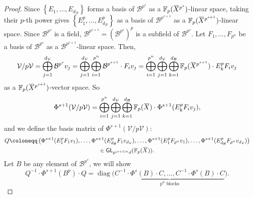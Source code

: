 \documentclass[letterpaper, 11pt, thm-restate]{article}
\numberwithin{equation}{section}
\newcommand{\F}{\mathbb{F}}
\newcommand{\GL}{\mathsf{GL}}
\newcommand{\diag}{\operatorname{diag}}
\newcommand{\mV}{\mathcal{V}}
\newcommand{\mB}{\mathcal{B}}
\newcommand{\oX}{\mkern 1.5mu\overline{\mkern-1.5mu X \mkern-1.5mu}\mkern 1.5mu}
\theoremstyle{definition}
\theoremstyle{definition}
\theoremstyle{definition}
\begin{document}
\begin{proof}
    Since $\left\{E_1, \ldots, E_{d_{\mB}}\right\}$ forms a basis of $\mB^{p^{s}}$ as a $\F_p(\oX^{p^{s}})$-linear space, taking their $p$-th power gives $\left\{E_1^p, \ldots, E_{d_{\mB}}^p\right\}$ as a basis of $\mB^{p^{s+1}}$ as a $\F_p(\oX^{p^{s+1}})$-linear space.
    Since $\mB^{p^s}$ is a field, $\mB^{p^{s+1}} = \left(\mB^{p^s}\right)^p$ is a subfield of $\mB^{p^s}$.
    Let $F_1, \ldots, F_{p^n}$ be a basis of $\mB^{p^s}$ as a $\mB^{p^{s+1}}$-linear space.
    Then,
    \[
    \mV/p\mV = \bigoplus_{j = 1}^{d_{\mV}} \mB^{p^s} v_j = \bigoplus_{j = 1}^{d_{\mV}} \bigoplus_{i = 1}^{p^n} \mB^{p^{s+1}} \cdot F_i v_j = \bigoplus_{i = 1}^{p^n} \bigoplus_{j = 1}^{d_{\mV}} \bigoplus_{k = 1}^{d_{\mB}} \F_p(\oX^{p^{s+1}}) \cdot E_k^p F_i v_j
    \]
    as a $\F_p(\oX^{p^{s+1}})$-vector space.
    So
    \[
    \Phi^{s+1}(\mV/p\mV) = \bigoplus_{i = 1}^{p^n} \bigoplus_{j = 1}^{d_{\mV}} \bigoplus_{k = 1}^{d_{\mB}} \F_p(\oX) \cdot \Phi^{s+1}(E_k^p F_i v_j),
    \]
    and we define the basis matrix of $\Phi^{s+1}(\mV/p\mV)$:
    \begin{multline*}
    Q \coloneqq \left(\Phi^{s+1}(E_1^p F_1 v_1), \ldots, \Phi^{s+1}(E_{d_{\mB}}^p F_1 v_{d_{\mV}}), \ldots, \Phi^{s+1}(E_1^p F_{p^n} v_1), \ldots, \Phi^{s+1}(E_{d_{\mB}}^p F_{p^n} v_{d_{\mV}}) \right) \\
    \in \GL_{p^{(s+1)n}d}(\F_p(\oX)).
    \end{multline*}
    Let $B$ be any element of $\mB^{p^s}$, we will show
    \[
    Q^{-1} \cdot \Phi^{s+1}(B^p) \cdot Q = \diag\Big(\underbrace{C^{-1} \cdot \Phi^{s}(B) \cdot C, \ldots, C^{-1} \cdot \Phi^{s}(B) \cdot C}_{p^n \text{ blocks}}\Big).
    \]


\end{proof}
\end{document}
